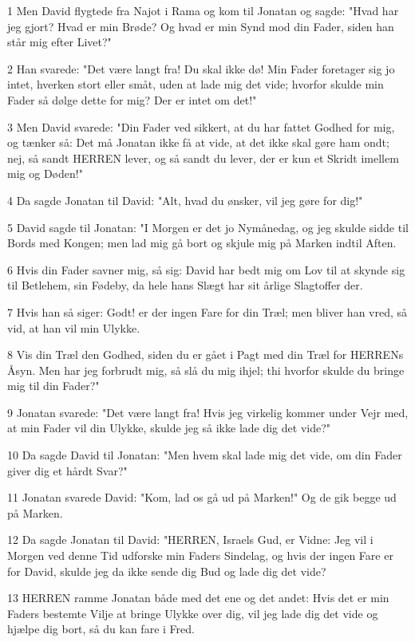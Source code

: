 \par 1 Men David flygtede fra Najot i Rama og kom til Jonatan og sagde: "Hvad har jeg gjort? Hvad er min Brøde? Og hvad er min Synd mod din Fader, siden han står mig efter Livet?"
\par 2 Han svarede: "Det være langt fra! Du skal ikke dø! Min Fader foretager sig jo intet, hverken stort eller småt, uden at lade mig det vide; hvorfor skulde min Fader så dølge dette for mig? Der er intet om det!"
\par 3 Men David svarede: "Din Fader ved sikkert, at du har fattet Godhed for mig, og tænker så: Det må Jonatan ikke få at vide, at det ikke skal gøre ham ondt; nej, så sandt HERREN lever, og så sandt du lever, der er kun et Skridt imellem mig og Døden!"
\par 4 Da sagde Jonatan til David: "Alt, hvad du ønsker, vil jeg gøre for dig!"
\par 5 David sagde til Jonatan: "I Morgen er det jo Nymånedag, og jeg skulde sidde til Bords med Kongen; men lad mig gå bort og skjule mig på Marken indtil Aften.
\par 6 Hvis din Fader savner mig, så sig: David har bedt mig om Lov til at skynde sig til Betlehem, sin Fødeby, da hele hans Slægt har sit årlige Slagtoffer der.
\par 7 Hvis han så siger: Godt! er der ingen Fare for din Træl; men bliver han vred, så vid, at han vil min Ulykke.
\par 8 Vis din Træl den Godhed, siden du er gået i Pagt med din Træl for HERRENs Åsyn. Men har jeg forbrudt mig, så slå du mig ihjel; thi hvorfor skulde du bringe mig til din Fader?"
\par 9 Jonatan svarede: "Det være langt fra! Hvis jeg virkelig kommer under Vejr med, at min Fader vil din Ulykke, skulde jeg så ikke lade dig det vide?"
\par 10 Da sagde David til Jonatan: "Men hvem skal lade mig det vide, om din Fader giver dig et hårdt Svar?"
\par 11 Jonatan svarede David: "Kom, lad os gå ud på Marken!" Og de gik begge ud på Marken.
\par 12 Da sagde Jonatan til David: "HERREN, Israels Gud, er Vidne: Jeg vil i Morgen ved denne Tid udforske min Faders Sindelag, og hvis der ingen Fare er for David, skulde jeg da ikke sende dig Bud og lade dig det vide?
\par 13 HERREN ramme Jonatan både med det ene og det andet: Hvis det er min Faders bestemte Vilje at bringe Ulykke over dig, vil jeg lade dig det vide og hjælpe dig bort, så du kan fare i Fred.
